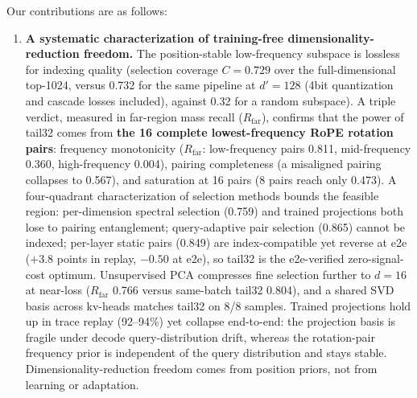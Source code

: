 \documentclass[11pt]{article}
\begin{document}
Our contributions are as follows:
\begin{enumerate}
\item \textbf{A systematic characterization of training-free dimensionality-reduction freedom.} The position-stable low-frequency subspace is lossless for indexing quality (selection coverage $C{=}0.729$ over the full-dimensional top-1024, versus 0.732 for the same pipeline at $d'{=}128$ (4bit quantization and cascade losses included), against 0.32 for a random subspace). A triple verdict, measured in far-region mass recall ($R_{\mathrm{far}}$), confirms that the power of tail32 comes from \textbf{the 16 complete lowest-frequency RoPE rotation pairs}: frequency monotonicity ($R_{\mathrm{far}}$: low-frequency pairs 0.811, mid-frequency 0.360, high-frequency 0.004), pairing completeness (a misaligned pairing collapses to 0.567), and saturation at 16 pairs (8 pairs reach only 0.473). A four-quadrant characterization of selection methods bounds the feasible region: per-dimension spectral selection (0.759) and trained projections both lose to pairing entanglement; query-adaptive pair selection (0.865) cannot be indexed; per-layer static pairs (0.849) are index-compatible yet reverse at e2e ($+3.8$ points in replay, $-0.50$ at e2e), so tail32 is the e2e-verified zero-signal-cost optimum. Unsupervised PCA compresses fine selection further to $d{=}16$ at near-loss ($R_{\mathrm{far}}$ 0.766 versus same-batch tail32 0.804), and a shared SVD basis across kv-heads matches tail32 on 8/8 samples. Trained projections hold up in trace replay (92--94\%) yet collapse end-to-end: the projection basis is fragile under decode query-distribution drift, whereas the rotation-pair frequency prior is independent of the query distribution and stays stable. Dimensionality-reduction freedom comes from position priors, not from learning or adaptation.

\end{enumerate}
\end{document}
